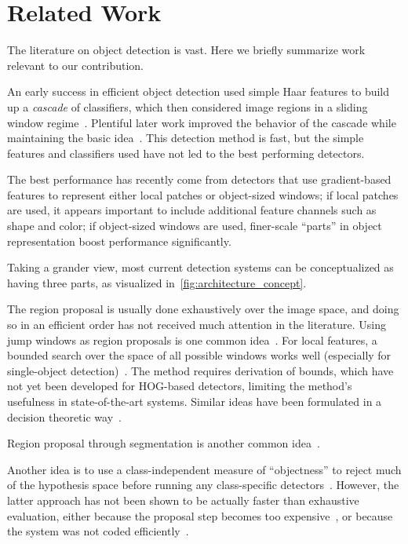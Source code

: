 \section{Related Work}
The literature on object detection is vast.
Here we briefly summarize work relevant to our contribution.

An early success in efficient object detection used simple Haar features to build up a \emph{cascade} of classifiers, which then considered image regions in a sliding window regime~\cite{Viola2001}.
Plentiful later work improved the behavior of the cascade while maintaining the basic idea~\cite{Bourdev2005}. 
This detection method is fast, but the simple features and classifiers used have not led to the best performing detectors.

The best performance has recently come from detectors that use gradient-based features to represent either local patches or object-sized windows; if local patches are used, it appears important to include additional feature channels such as shape and color; if object-sized windows are used, finer-scale ``parts'' in object representation boost performance significantly.


Taking a grander view, most current detection systems can be conceptualized as having three parts, as visualized in~\autoref{fig:architecture_concept}.

The region proposal is usually done exhaustively over the image space, and doing so in an efficient order has not received much attention in the literature.
Using jump windows as region proposals is one common idea~\cite{Chum2007b,Vijayanarasimhan2011}.
For local features, a bounded search over the space of all possible windows works well (especially for single-object detection)~\cite{Lampert2008b}.
The method requires derivation of bounds, which have not yet been developed for HOG-based detectors, limiting the method's usefulness in state-of-the-art systems.
Similar ideas have been formulated in a decision theoretic way~\cite{Sznitman2010}.

Region proposal through segmentation is another common idea~\cite{Russakovsky2010}.

Another idea is to use a class-independent measure of ``objectness'' to reject much of the hypothesis space before running any class-specific detectors~\cite{Alexe2010,Endres2010}.
However, the latter approach has not been shown to be actually faster than exhaustive evaluation, either because the proposal step becomes too expensive~\cite{Endres2010}, or because the system was not coded efficiently~\cite{Alexe2010}.

